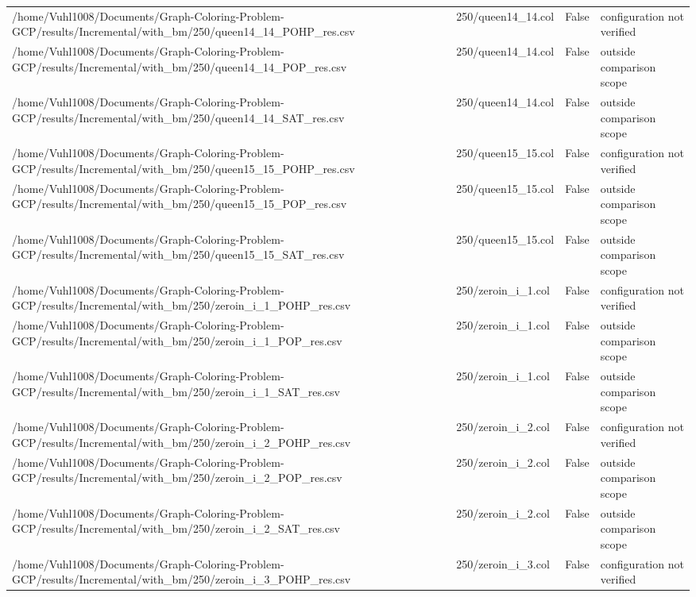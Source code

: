 \begin{table}[htbp]
\begin{tabular}{llll}
/home/Vuhl1008/Documents/Graph-Coloring-Problem-GCP/results/Incremental/with\_bm/250/queen14\_14\_POHP\_res.csv & 250/queen14\_14.col & False & configuration not verified \\
/home/Vuhl1008/Documents/Graph-Coloring-Problem-GCP/results/Incremental/with\_bm/250/queen14\_14\_POP\_res.csv & 250/queen14\_14.col & False & outside comparison scope \\
/home/Vuhl1008/Documents/Graph-Coloring-Problem-GCP/results/Incremental/with\_bm/250/queen14\_14\_SAT\_res.csv & 250/queen14\_14.col & False & outside comparison scope \\
/home/Vuhl1008/Documents/Graph-Coloring-Problem-GCP/results/Incremental/with\_bm/250/queen15\_15\_POHP\_res.csv & 250/queen15\_15.col & False & configuration not verified \\
/home/Vuhl1008/Documents/Graph-Coloring-Problem-GCP/results/Incremental/with\_bm/250/queen15\_15\_POP\_res.csv & 250/queen15\_15.col & False & outside comparison scope \\
/home/Vuhl1008/Documents/Graph-Coloring-Problem-GCP/results/Incremental/with\_bm/250/queen15\_15\_SAT\_res.csv & 250/queen15\_15.col & False & outside comparison scope \\
/home/Vuhl1008/Documents/Graph-Coloring-Problem-GCP/results/Incremental/with\_bm/250/zeroin\_i\_1\_POHP\_res.csv & 250/zeroin\_i\_1.col & False & configuration not verified \\
/home/Vuhl1008/Documents/Graph-Coloring-Problem-GCP/results/Incremental/with\_bm/250/zeroin\_i\_1\_POP\_res.csv & 250/zeroin\_i\_1.col & False & outside comparison scope \\
/home/Vuhl1008/Documents/Graph-Coloring-Problem-GCP/results/Incremental/with\_bm/250/zeroin\_i\_1\_SAT\_res.csv & 250/zeroin\_i\_1.col & False & outside comparison scope \\
/home/Vuhl1008/Documents/Graph-Coloring-Problem-GCP/results/Incremental/with\_bm/250/zeroin\_i\_2\_POHP\_res.csv & 250/zeroin\_i\_2.col & False & configuration not verified \\
/home/Vuhl1008/Documents/Graph-Coloring-Problem-GCP/results/Incremental/with\_bm/250/zeroin\_i\_2\_POP\_res.csv & 250/zeroin\_i\_2.col & False & outside comparison scope \\
/home/Vuhl1008/Documents/Graph-Coloring-Problem-GCP/results/Incremental/with\_bm/250/zeroin\_i\_2\_SAT\_res.csv & 250/zeroin\_i\_2.col & False & outside comparison scope \\
/home/Vuhl1008/Documents/Graph-Coloring-Problem-GCP/results/Incremental/with\_bm/250/zeroin\_i\_3\_POHP\_res.csv & 250/zeroin\_i\_3.col & False & configuration not verified \\

\end{tabular}
\end{table}
